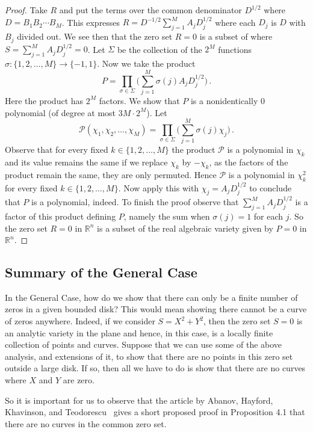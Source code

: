 \documentclass{article}
\theoremstyle{remark}
\numberwithin{equation}{section}
\begin{document}
\begin{proof} Take $R$ and put the terms over the common denominator $D^{1/2}$ where $D =B_1B_2 \cdots B_M$.  This expresses
$R = D^{-1/2} \sum_{j=1}^M{A_j D_j^{1/2}}$ where each $D_j$ is $D$ with $B_j$ divided out.  We see then that the zero set $R = 0$ is a subset of where
$S = \sum_{j=1}^M {A_jD_j^{1/2}} = 0$. Let $\Sigma$ be the collection of the $2^M$ functions $\sigma: \{1,2,\ldots,M\} \rightarrow \{-1,1\}$.
Now we take the product
$$P = \prod_{\sigma \in \Sigma}{\Bigg( \sum_{j=1}^M{\sigma(j)A_j D_j^{1/2}} \Bigg)}\,.$$
Here the product has $2^M$ factors. We show that $P$ is a nonidentically $0$ polynomial (of degree at most $3M \cdot 2^M$). Let
$${\mathcal P}(\chi_1,\chi_2,\ldots,\chi_M) = \prod_{\sigma \in \Sigma}{\bigg( \sum_{j=1}^M{\sigma(j) \chi_j} \Bigg)}\,.$$
Observe that for every fixed $k \in \{1,2,\ldots,M\}$ the product ${\mathcal P}$ is a polynomial in $\chi_k$ and its value remains the same if we replace
$\chi_k$ by $-\chi_k$, as the factors of the product remain the same, they are only permuted.
Hence ${\mathcal P}$ is a polynomial in $\chi_k^2$ for every fixed $k \in \{1,2,\ldots,M\}$. Now apply this with $\chi_j = A_jD_j^{1/2}$ to conclude that $P$
is a polynomial, indeed.
To finish the proof observe that $\sum_{j=1}^M{A_jD_j^{1/2}}$ is a factor of this product defining $P$, namely the sum when $\sigma(j) =1$
for each $j$. So the zero set $R = 0$ in ${\mathbb R}^n$ is a subset of the real algebraic variety given by $P = 0$ in ${\mathbb R}^n$.
\end{proof}

\subsection{Summary of the General Case}\label{GenSum}

In the General Case, how do we show that there can only be a finite number of zeros in a given bounded disk?   This would mean showing there cannot be a curve of zeros anywhere.   Indeed, if we consider $S = X^2 + Y^2$, then the zero set $S = 0$ is an analytic variety in the plane and hence, in this case, is a locally finite collection of points 
and curves. Suppose that we can use some of the above analysis, and extensions of it, to show that there are no points in this zero set outside a large disk.  If so, then all we have to do is show that there are no curves where $X$ and $Y$ are zero.

So it is important for us to observe that the article by Abanov, Hayford, Khavinson, and Teodorescu~\cite{AHKT} gives a short proposed proof in Proposition 4.1 that there 
are no curves in the common zero set.  
\end{document}
